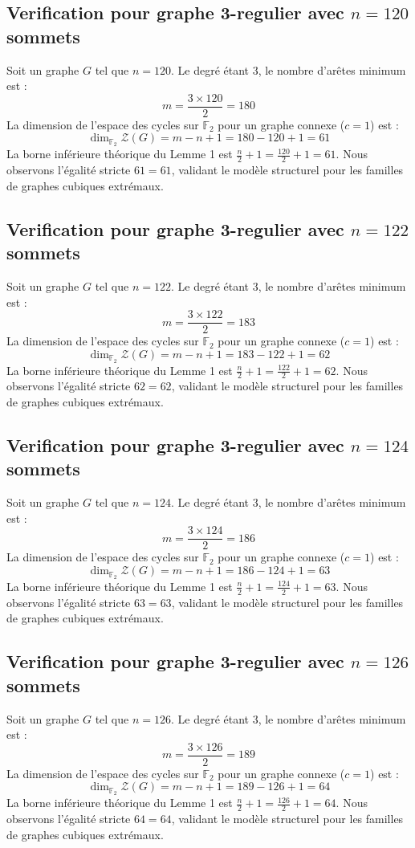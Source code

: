 \documentclass[11pt,a4paper]{article}
\begin{document}
\subsection{Verification pour graphe 3-regulier avec $n=120$ sommets}
Soit un graphe $G$ tel que $n = 120$. Le degré étant 3, le nombre d'arêtes minimum est :
$$ m = \frac{3 \times 120}{2} = 180 $$
La dimension de l'espace des cycles sur $\mathbb{F}_2$ pour un graphe connexe ($c=1$) est :
$$ \dim_{\mathbb{F}_2} \mathcal{Z}(G) = m - n + 1 = 180 - 120 + 1 = 61 $$
La borne inférieure théorique du Lemme 1 est $\frac{n}{2} + 1 = \frac{120}{2} + 1 = 61$.
Nous observons l'égalité stricte $61 = 61$, validant le modèle structurel pour les familles de graphes cubiques extrémaux.

\subsection{Verification pour graphe 3-regulier avec $n=122$ sommets}
Soit un graphe $G$ tel que $n = 122$. Le degré étant 3, le nombre d'arêtes minimum est :
$$ m = \frac{3 \times 122}{2} = 183 $$
La dimension de l'espace des cycles sur $\mathbb{F}_2$ pour un graphe connexe ($c=1$) est :
$$ \dim_{\mathbb{F}_2} \mathcal{Z}(G) = m - n + 1 = 183 - 122 + 1 = 62 $$
La borne inférieure théorique du Lemme 1 est $\frac{n}{2} + 1 = \frac{122}{2} + 1 = 62$.
Nous observons l'égalité stricte $62 = 62$, validant le modèle structurel pour les familles de graphes cubiques extrémaux.

\subsection{Verification pour graphe 3-regulier avec $n=124$ sommets}
Soit un graphe $G$ tel que $n = 124$. Le degré étant 3, le nombre d'arêtes minimum est :
$$ m = \frac{3 \times 124}{2} = 186 $$
La dimension de l'espace des cycles sur $\mathbb{F}_2$ pour un graphe connexe ($c=1$) est :
$$ \dim_{\mathbb{F}_2} \mathcal{Z}(G) = m - n + 1 = 186 - 124 + 1 = 63 $$
La borne inférieure théorique du Lemme 1 est $\frac{n}{2} + 1 = \frac{124}{2} + 1 = 63$.
Nous observons l'égalité stricte $63 = 63$, validant le modèle structurel pour les familles de graphes cubiques extrémaux.

\subsection{Verification pour graphe 3-regulier avec $n=126$ sommets}
Soit un graphe $G$ tel que $n = 126$. Le degré étant 3, le nombre d'arêtes minimum est :
$$ m = \frac{3 \times 126}{2} = 189 $$
La dimension de l'espace des cycles sur $\mathbb{F}_2$ pour un graphe connexe ($c=1$) est :
$$ \dim_{\mathbb{F}_2} \mathcal{Z}(G) = m - n + 1 = 189 - 126 + 1 = 64 $$
La borne inférieure théorique du Lemme 1 est $\frac{n}{2} + 1 = \frac{126}{2} + 1 = 64$.
Nous observons l'égalité stricte $64 = 64$, validant le modèle structurel pour les familles de graphes cubiques extrémaux.
\end{document}
